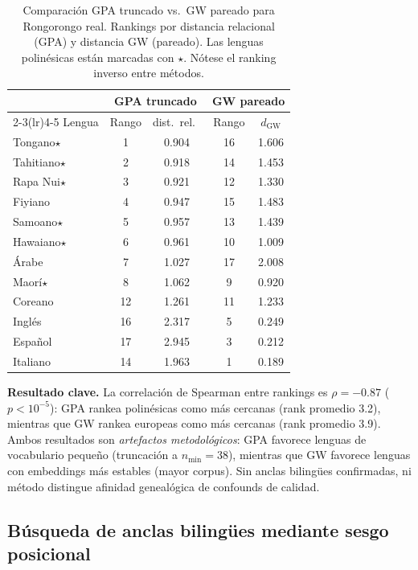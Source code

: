 \documentclass[11pt,a4paper]{article}
\newcommand{\1}{\mathbf{1}}
\numberwithin{equation}{section}
\begin{document}
\begin{table}[h]
\centering
\caption{Comparación GPA truncado vs.\ GW pareado para Rongorongo real. Rankings por distancia relacional (GPA) y distancia GW (pareado). Las lenguas polinésicas están marcadas con $\star$. Nótese el ranking inverso entre métodos.}
\label{tab:gpa_vs_gw}
\begin{tabular}{lcccc}
\toprule
& \multicolumn{2}{c}{GPA truncado} & \multicolumn{2}{c}{GW pareado} \\
\cmidrule(lr){2-3}\cmidrule(lr){4-5}
Lengua & Rango & dist.\ rel.\ & Rango & $d_{\mathrm{GW}}$ \\
\midrule
Tongano$\star$ & 1 & 0.904 & 16 & 1.606 \\
Tahitiano$\star$ & 2 & 0.918 & 14 & 1.453 \\
Rapa Nui$\star$ & 3 & 0.921 & 12 & 1.330 \\
Fiyiano & 4 & 0.947 & 15 & 1.483 \\
Samoano$\star$ & 5 & 0.957 & 13 & 1.439 \\
Hawaiano$\star$ & 6 & 0.961 & 10 & 1.009 \\
Árabe & 7 & 1.027 & 17 & 2.008 \\
Maorí$\star$ & 8 & 1.062 & 9 & 0.920 \\
\midrule
Coreano & 12 & 1.261 & 11 & 1.233 \\
Inglés & 16 & 2.317 & 5 & 0.249 \\
Español & 17 & 2.945 & 3 & 0.212 \\
Italiano & 14 & 1.963 & 1 & 0.189 \\
\bottomrule
\end{tabular}
\end{table}

\textbf{Resultado clave.} La correlación de Spearman entre rankings es $\rho=-0.87$ ($p<10^{-5}$): GPA rankea polinésicas como más cercanas (rank promedio 3.2), mientras que GW rankea europeas como más cercanas (rank promedio 3.9). Ambos resultados son \emph{artefactos metodológicos}: GPA favorece lenguas de vocabulario pequeño (truncación a $n_{\min}=38$), mientras que GW favorece lenguas con embeddings más estables (mayor corpus). Sin anclas bilingües confirmadas, ni método distingue afinidad genealógica de confounds de calidad.

\subsection{Búsqueda de anclas bilingües mediante sesgo posicional}
\end{document}
